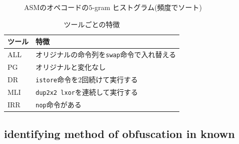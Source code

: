 \documentclass[conference]{IEEEtran}
\begin{document}
\begin{figure}[b]
{    \label{fig:asm-5gram-MLI-histogram}
  }%
  \caption{ASMのオペコードの$5$-gram ヒストグラム(頻度でソート)}\label{fig:asm-5gram-histogram}
\end{figure}



%
%
%


\begin{table}[t]
  \centering
  \footnotesize{
    \caption{ツールごとの特徴}\label{table:features}
  \begin{tabular}{l|l}
    ツール              & 特徴　\\ \hline
    ALL & オリジナルの命令列を\texttt{swap}命令で入れ替える \\
    PG  & オリジナルと変化なし \\
    DR  & \texttt{istore}命令を2回続けて実行する \\
    MLI & \texttt{dup2x2 lxor}を連続して実行する \\
    IRR & \texttt{nop}命令がある \\
  \end{tabular}}
\end{table}


\subsection{identifying method of obfuscation in known}
\end{document}
